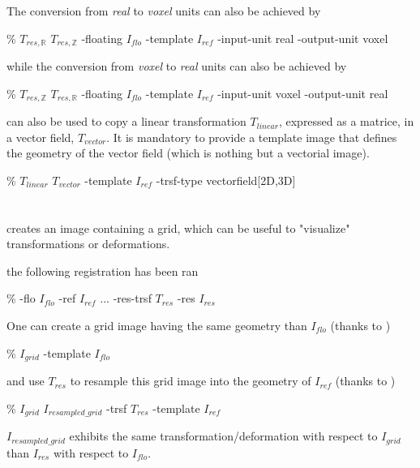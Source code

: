 The conversion from \textit{real} to \textit{voxel} units can also be achieved by 
\begin{code}{0.8}
\% \copyTrsf $T_{res,\mathbb{R}}$ $T_{res,\mathbb{Z}}$ -floating $I_{flo}$ -template $I_{ref}$ -input-unit real -output-unit voxel
\end{code}
while the conversion from \textit{voxel} to \textit{real} units can also be achieved by 
\begin{code}{0.8}
\% \copyTrsf $T_{res,\mathbb{Z}}$ $T_{res,\mathbb{R}}$ -floating $I_{flo}$ -template $I_{ref}$ -input-unit voxel -output-unit real
\end{code}

\copyTrsf can also be used to copy a linear transformation $T_{linear}$, expressed as a matrice, in a vector field, $T_{vector}$. It is mandatory to provide a template image that defines the geometry of the vector field (which is nothing but a vectorial image).

\begin{code}{0.8}
\% \copyTrsf $T_{linear}$ $T_{vector}$  -template $I_{ref}$ -trsf-type vectorfield[2D,3D]
\end{code}






\section{\createGrid}

\createGrid creates an image containing a grid, which can be useful to "visualize" transformations or deformations.


 the following registration has been ran
\begin{code}{1}
\% \blockmatching -flo $I_{flo}$ -ref $I_{ref}$ ... -res-trsf $T_{res}$ -res $I_{res}$
\end{code}
One can create a grid image having the same geometry than $I_{flo}$ (thanks to )
\begin{code}{1}
\% \createGrid $I_{grid}$ -template $I_{flo}$ 
\end{code}
and use $T_{res}$ to resample this grid image into the geometry of $I_{ref}$ (thanks to )
\begin{code}{1}
\% \applyTrsf $I_{grid}$ $I_{resampled\_grid}$ -trsf $T_{res}$ -template $I_{ref}$ 
\end{code}
$I_{resampled\_grid}$ exhibits the same transformation/deformation with respect to $I_{grid}$ than 
$I_{res}$ with respect to $I_{flo}$.



